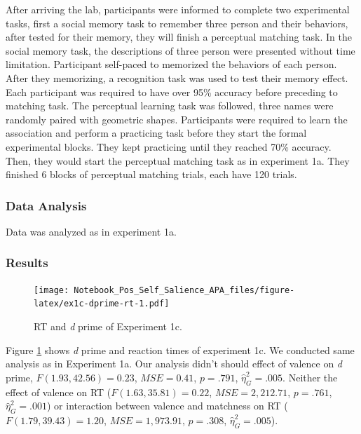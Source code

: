 \documentclass[
  english,
  man]{apa6}
\begin{document}
After arriving the lab, participants were informed to complete two experimental tasks, first a social memory task to remember three person and their behaviors, after tested for their memory, they will finish a perceptual matching task.
In the social memory task, the descriptions of three person were presented without time limitation. Participant self-paced to memorized the behaviors of each person. After they memorizing, a recognition task was used to test their memory effect. Each participant was required to have over 95\% accuracy before preceding to matching task.
The perceptual learning task was followed, three names were randomly paired with geometric shapes. Participants were required to learn the association and perform a practicing task before they start the formal experimental blocks. They kept practicing until they reached 70\% accuracy. Then, they would start the perceptual matching task as in experiment 1a. They finished 6 blocks of perceptual matching trials, each have 120 trials.

\hypertarget{data-analysis-3}{%
\subsubsection{Data Analysis}\label{data-analysis-3}}

Data was analyzed as in experiment 1a.

\hypertarget{results-2}{%
\subsubsection{Results}\label{results-2}}

\begin{figure}
\centering
\texttt{[image: Notebook\_Pos\_Self\_Salience\_APA\_files/figure-latex/ex1c-dprime-rt-1.pdf]}
\caption{\label{fig:ex1c-dprime-rt}RT and \emph{d} prime of Experiment 1c.}
\end{figure}

Figure \ref{fig:ex1c-dprime-rt} shows \emph{d} prime and reaction times of experiment 1c. We conducted same analysis as in Experiment 1a. Our analysis didn't should effect of valence on \emph{d} prime, \(F(1.93, 42.56) = 0.23\), \(\mathit{MSE} = 0.41\), \(p = .791\), \(\hat{\eta}^2_G = .005\). Neither the effect of valence on RT (\(F(1.63, 35.81) = 0.22\), \(\mathit{MSE} = 2,212.71\), \(p = .761\), \(\hat{\eta}^2_G = .001\)) or interaction between valence and matchness on RT (\(F(1.79, 39.43) = 1.20\), \(\mathit{MSE} = 1,973.91\), \(p = .308\), \(\hat{\eta}^2_G = .005\)).
\end{document}
